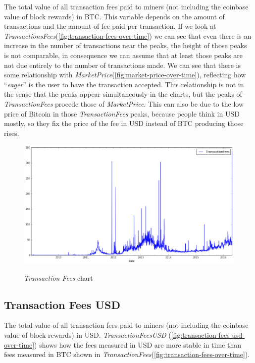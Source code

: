 The total value of all transaction fees paid to miners (not including
the coinbase value of block rewards) in BTC. This variable depends on
the amount of transactions and the amount of fee paid per transaction.
If we look at
\textit{TransactionsFees}(\autoref{fig:transaction-fees-over-time}) we
can see that even there is an increase in the number of transactions
near the peaks, the height of those peaks is not comparable, in
consequence we can assume that at least those peaks are not due
entirely to the number of transactions made. We can see that there is
some relationship with
\textit{MarketPrice}(\autoref{fig:market-price-over-time}), reflecting
how ``\textit{eager}'' is the user to have the transaction accepted.
This relationship is not in the sense that the peaks appear
simultaneously in the charts, but the peaks of
\textit{TransactionFees} procede those of \textit{MarketPrice}. This
can also be due to the low price of Bitcoin in those
\textit{TransactionFees} peaks, because people think in USD mostly, so
they fix the price of the fee in USD instead of BTC producing those
rises.

\begin{figure}[bth]
  \myfloatalign
  {\includegraphics[width=1\linewidth]
    {gfx/transaction-fees-over-time}}
  \caption{\textit{Transaction Fees} chart}
  \label{fig:transaction-fees-over-time}
\end{figure}


\subsection{Transaction Fees USD}
\label{sec:transaction-fees-usd}

The total value of all transaction fees paid to miners (not including
the coinbase value of block rewards) in USD.
\textit{TransactionFeesUSD}
(\autoref{fig:transaction-fees-usd-over-time}) shows how the fees
measured in USD are more stable in time than fees measured in BTC
shown in
\textit{TransactionFees}(\autoref{fig:transaction-fees-over-time}).

